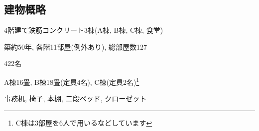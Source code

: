 \documentclass[10pt,b5jsbook,dvips,dvipdfmx,openany]{jsbook}
\theoremstyle{definition}
\begin{document}
		\subsection{建物概略}
		\begin{description}
		\item 4階建て鉄筋コンクリート3棟(A棟, B棟, C棟, 食堂)
		\item 築約50年, 各階11部屋(例外あり), 総部屋数127
		\item[定員] 422名
		\item[居室] A棟16畳,  B棟18畳(定員4名), C棟(定員2名)\footnote{C棟は3部屋を6人で用いるなどしています}
		\item[備品] 事務机, 椅子, 本棚, 二段ベッド, クローゼット
		\end{description}




 \newpage
\end{document}
